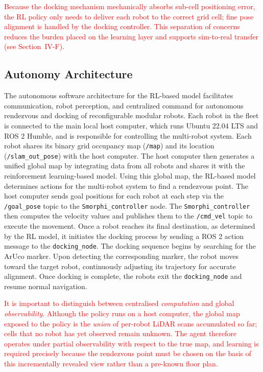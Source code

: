 \documentclass[journal]{IEEEtran}
\begin{document}
\textcolor{red}{Because the docking mechanism mechanically absorbs sub-cell positioning error, the RL policy only needs to deliver each robot to the correct grid cell; fine pose alignment is handled by the docking controller. This separation of concerns reduces the burden placed on the learning layer and supports sim-to-real transfer (see Section~IV-F).}

\subsection{Autonomy Architecture}

The autonomous software architecture for the RL-based model facilitates communication, robot perception, and centralized command for autonomous rendezvous and docking of reconfigurable modular robots.
Each robot in the fleet is connected to the main local host computer, which runs Ubuntu 22.04 LTS and ROS 2 Humble, and is responsible for controlling the multi-robot system. Each robot shares its binary grid occupancy map (\texttt{/map}) and its location (\texttt{/slam\_out\_pose}) with the host computer. The host computer then generates a unified global map by integrating data from all robots and shares it with the reinforcement learning-based model. Using this global map, the RL-based model determines actions for the multi-robot system to find a rendezvous point. The host computer sends goal positions for each robot at each step via the \texttt{/goal\_pose} topic to the \texttt{Smorphi\_controller} node. The \texttt{Smorphi\_controller} then computes the velocity values and publishes them to the \texttt{/cmd\_vel} topic to execute the movement. Once a robot reaches its final destination, as determined by the RL model, it initiates the docking process by sending a ROS 2 action message to the \texttt{docking\_node}. The docking sequence begins by searching for the ArUco marker. Upon detecting the corresponding marker, the robot moves toward the target robot, continuously adjusting its trajectory for accurate alignment. Once docking is complete, the robots exit the \texttt{docking\_node} and resume normal navigation.

\textcolor{red}{It is important to distinguish between centralised \emph{computation} and global \emph{observability}. Although the policy runs on a host computer, the global map exposed to the policy is the \emph{union} of per-robot LiDAR scans accumulated so far; cells that no robot has yet observed remain unknown. The agent therefore operates under partial observability with respect to the true map, and learning is required precisely because the rendezvous point must be chosen on the basis of this incrementally revealed view rather than a pre-known floor plan.}
\end{document}
